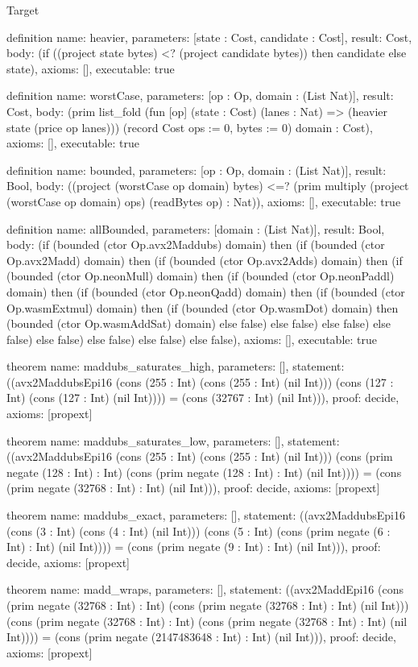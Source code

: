 \begin{lexlean}{Target}
\begin{semanticmodule}
definition{
  name: heavier,
  parameters: [state : Cost, candidate : Cost],
  result: Cost,
  body: (if ((project state bytes) <? (project candidate bytes)) then candidate else state),
  axioms: [],
  executable: true
}

definition{
  name: worstCase,
  parameters: [op : Op, domain : (List Nat)],
  result: Cost,
  body: (prim list_fold (fun [op] (state : Cost) (lanes : Nat) => (heavier state (price op lanes))) (record Cost {ops := 0, bytes := 0}) domain : Cost),
  axioms: [],
  executable: true
}

definition{
  name: bounded,
  parameters: [op : Op, domain : (List Nat)],
  result: Bool,
  body: ((project (worstCase op domain) bytes) <=? (prim multiply (project (worstCase op domain) ops) (readBytes op) : Nat)),
  axioms: [],
  executable: true
}

definition{
  name: allBounded,
  parameters: [domain : (List Nat)],
  result: Bool,
  body: (if (bounded (ctor Op.avx2Maddubs) domain) then (if (bounded (ctor Op.avx2Madd) domain) then (if (bounded (ctor Op.avx2Adds) domain) then (if (bounded (ctor Op.neonMull) domain) then (if (bounded (ctor Op.neonPaddl) domain) then (if (bounded (ctor Op.neonQadd) domain) then (if (bounded (ctor Op.wasmExtmul) domain) then (if (bounded (ctor Op.wasmDot) domain) then (bounded (ctor Op.wasmAddSat) domain) else false) else false) else false) else false) else false) else false) else false) else false),
  axioms: [],
  executable: true
}

theorem{
  name: maddubs_saturates_high,
  parameters: [],
  statement: ((avx2MaddubsEpi16 (cons (255 : Int) (cons (255 : Int) (nil Int))) (cons (127 : Int) (cons (127 : Int) (nil Int)))) = (cons (32767 : Int) (nil Int))),
  proof: decide{},
  axioms: [propext]
}

theorem{
  name: maddubs_saturates_low,
  parameters: [],
  statement: ((avx2MaddubsEpi16 (cons (255 : Int) (cons (255 : Int) (nil Int))) (cons (prim negate (128 : Int) : Int) (cons (prim negate (128 : Int) : Int) (nil Int)))) = (cons (prim negate (32768 : Int) : Int) (nil Int))),
  proof: decide{},
  axioms: [propext]
}

theorem{
  name: maddubs_exact,
  parameters: [],
  statement: ((avx2MaddubsEpi16 (cons (3 : Int) (cons (4 : Int) (nil Int))) (cons (5 : Int) (cons (prim negate (6 : Int) : Int) (nil Int)))) = (cons (prim negate (9 : Int) : Int) (nil Int))),
  proof: decide{},
  axioms: [propext]
}

theorem{
  name: madd_wraps,
  parameters: [],
  statement: ((avx2MaddEpi16 (cons (prim negate (32768 : Int) : Int) (cons (prim negate (32768 : Int) : Int) (nil Int))) (cons (prim negate (32768 : Int) : Int) (cons (prim negate (32768 : Int) : Int) (nil Int)))) = (cons (prim negate (2147483648 : Int) : Int) (nil Int))),
  proof: decide{},
  axioms: [propext]
}


\end{semanticmodule}
\end{lexlean}
